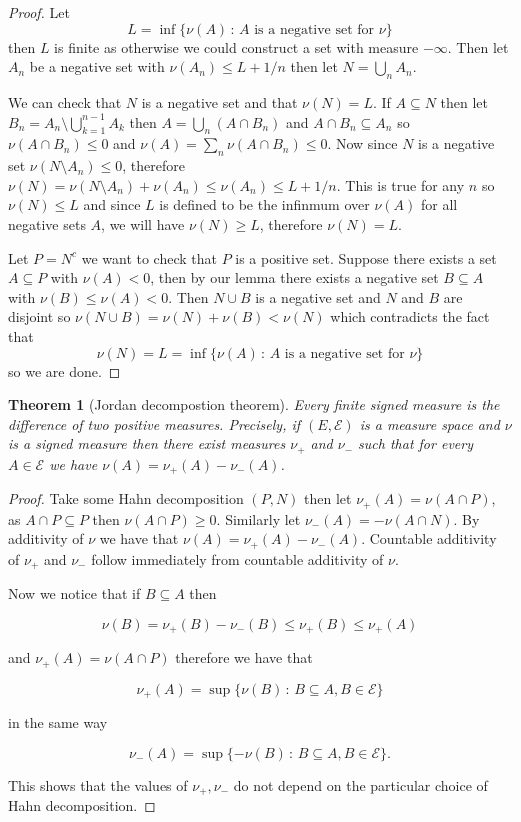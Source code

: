 \documentclass[
]{book}
\newtheorem{theorem}{Theorem}[chapter]
\theoremstyle{definition}
\theoremstyle{definition}
\theoremstyle{definition}
\theoremstyle{definition}
\theoremstyle{remark}
\begin{document}
\begin{proof}
Let \[L = \inf\{ \nu(A)\,:\, \mbox{$A$ is a negative set for $\nu$}\}\] then \(L\) is finite as otherwise we could construct a set with measure \(-\infty\). Then let \(A_n\) be a negative set with \(\nu(A_n) \leq L+1/n\) then let \(N = \bigcup_n A_n\).

We can check that \(N\) is a negative set and that \(\nu(N) = L\). If \(A \subseteq N\) then let \(B_n = A_n \setminus \bigcup_{k=1}^{n-1}A_k\) then \(A = \bigcup_n (A \cap B_n)\) and \(A \cap B_n \subseteq A_n\) so \(\nu(A \cap B_n) \leq 0\) and \(\nu(A) = \sum_n \nu(A \cap B_n) \leq 0\). Now since \(N\) is a negative set \(\nu(N \setminus A_n) \leq 0\), therefore \(\nu(N) = \nu(N \setminus A_n) + \nu(A_n) \leq \nu(A_n) \leq L +1/n\). This is true for any \(n\) so \(\nu(N) \leq L\) and since \(L\) is defined to be the infinmum over \(\nu(A)\) for all negative sets \(A\), we will have \(\nu(N) \geq L\), therefore \(\nu(N) = L\).

Let \(P = N^c\) we want to check that \(P\) is a positive set. Suppose there exists a set \(A \subseteq P\) with \(\nu(A) < 0\), then by our lemma there exists a negative set \(B \subseteq A\) with \(\nu(B) \leq \nu(A)<0\). Then \(N \cup B\) is a negative set and \(N\) and \(B\) are disjoint so \(\nu(N \cup B) = \nu(N) + \nu(B) < \nu(N)\) which contradicts the fact that \[\nu(N) = L = \inf\{ \nu(A)\,:\, \mbox{$A$ is a negative set for $\nu$}\}\] so we are done.
\end{proof}

\begin{theorem}[Jordan decompostion theorem]
Every finite signed measure is the difference of two positive measures. Precisely, if \((E, \mathcal{E})\) is a measure space and \(\nu\) is a signed measure then there exist measures \(\nu_+\) and \(\nu_-\) such that for every \(A \in \mathcal{E}\) we have \(\nu(A) = \nu_+(A)- \nu_-(A)\).
\end{theorem}

\begin{proof}
Take some Hahn decomposition \((P, N)\) then let \(\nu_+(A) = \nu(A \cap P)\), as \(A \cap P \subseteq P\) then \(\nu(A \cap P) \geq 0\). Similarly let \(\nu_-(A) = -\nu(A \cap N)\). By additivity of \(\nu\) we have that \(\nu(A) = \nu_+(A) - \nu_-(A)\). Countable additivity of \(\nu_+\) and \(\nu_-\) follow immediately from countable additivity of \(\nu\).

Now we notice that if \(B \subseteq A\) then

\[ \nu(B) = \nu_+(B) - \nu_-(B) \leq \nu_+(B) \leq \nu_+(A) \]

and \(\nu_+(A) = \nu(A \cap P)\) therefore we have that

\[ \nu_+(A)  = \sup\{\nu(B) \,:\, B \subseteq A, B \in \mathcal{E}\} \]

in the same way

\[ \nu_-(A) = \sup\{ - \nu(B) \,:\, B \subseteq A, B \in \mathcal{E}\}. \]

This shows that the values of \(\nu_+, \nu_-\) do not depend on the particular choice of Hahn decomposition.
\end{proof}
\end{document}
